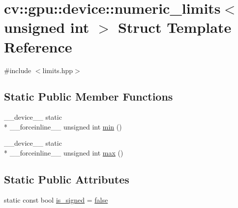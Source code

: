 \hypertarget{structcv_1_1gpu_1_1device_1_1numeric__limits_3_01unsigned_01int_01_4}{\section{cv\-:\-:gpu\-:\-:device\-:\-:numeric\-\_\-limits$<$ unsigned int $>$ Struct Template Reference}
\label{structcv_1_1gpu_1_1device_1_1numeric__limits_3_01unsigned_01int_01_4}
}


{\ttfamily \#include $<$limits.\-hpp$>$}

\subsection*{Static Public Member Functions}
\begin{DoxyCompactItemize}
\item 
\-\_\-\-\_\-device\-\_\-\-\_\- static \\*
\-\_\-\-\_\-forceinline\-\_\-\-\_\- unsigned int \hyperlink{structcv_1_1gpu_1_1device_1_1numeric__limits_3_01unsigned_01int_01_4_afddd2df1d43d80764af8b7df43cb54c5}{min} ()
\item 
\-\_\-\-\_\-device\-\_\-\-\_\- static \\*
\-\_\-\-\_\-forceinline\-\_\-\-\_\- unsigned int \hyperlink{structcv_1_1gpu_1_1device_1_1numeric__limits_3_01unsigned_01int_01_4_add116de7b87baa6d135a60c1e4fd77e8}{max} ()
\end{DoxyCompactItemize}
\subsection*{Static Public Attributes}
\begin{DoxyCompactItemize}
\item 
static const bool \hyperlink{structcv_1_1gpu_1_1device_1_1numeric__limits_3_01unsigned_01int_01_4_a20ba90d6e6f31a0e9121ac9fbb05756c}{is\-\_\-signed} = \hyperlink{namespacecv_1_1gpu_1_1device_af8d6418be1712e83b4f398e7e7273026}{false}
\end{DoxyCompactItemize}


